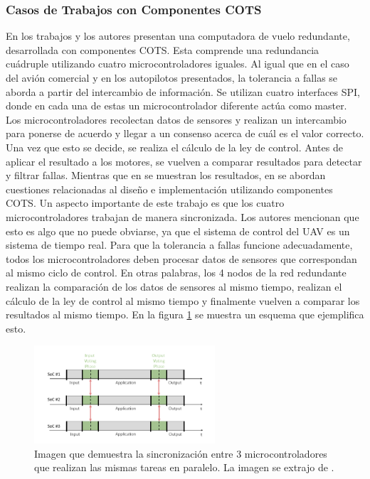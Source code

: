 \subsubsection{Casos de Trabajos con Componentes COTS}

En los trabajos \cite{hiergeist2018implementation} y \cite{hiergeist2017internal} los autores presentan una computadora de vuelo redundante, desarrollada con componentes COTS. Esta comprende una redundancia cuádruple utilizando cuatro microcontroladores iguales. Al igual que en el caso del avión comercial y en los autopilotos presentados, la tolerancia a fallas se aborda a partir del intercambio de información. Se utilizan cuatro interfaces SPI, donde en cada una de estas un microcontrolador diferente actúa como master. Los microcontroladores recolectan datos de sensores y realizan un intercambio para ponerse de acuerdo y llegar a un consenso acerca de cuál es el valor correcto. Una vez que esto se decide, se realiza el cálculo de la ley de control. Antes de aplicar el resultado a los motores, se vuelven a comparar resultados para detectar y filtrar fallas. Mientras que en \cite{hiergeist2018implementation} se muestran los resultados, en \cite{hiergeist2017internal} se abordan cuestiones relacionadas al diseño e implementación utilizando componentes COTS. Un aspecto importante de este trabajo es que los cuatro microcontroladores trabajan de manera sincronizada. Los autores mencionan que esto es algo que no puede obviarse, ya que el sistema de control del UAV es un sistema de tiempo real. Para que la tolerancia a fallas funcione adecuadamente, todos los microcontroladores deben procesar datos de sensores que correspondan al mismo ciclo de control. En otras palabras, los 4 nodos de la red redundante realizan la comparación de los datos de sensores al mismo tiempo, realizan el cálculo de la ley de control al mismo tiempo y finalmente vuelven a comparar los resultados al mismo tiempo. En la figura \ref{fig:frame_lock_approach} se muestra un esquema que ejemplifica esto.

\begin{figure}[H]
    \centering
    \includegraphics[width=0.6\textwidth]{img/frame_lock_approach.png}
    \caption{Imagen que demuestra la sincronización entre 3 microcontroladores que realizan las mismas tareas en paralelo. La imagen se extrajo de \cite{hiergeist2017internal}.}
    \label{fig:frame_lock_approach}
\end{figure}

